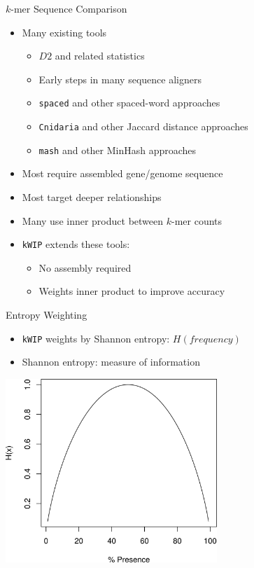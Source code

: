 \documentclass[t]{beamer}
\begin{document}
\begin{frame}{$k$-mer Sequence Comparison}
  \begin{itemize}
    \item Many existing tools
    \begin{itemize}
      \item $D2$ and related statistics
      \item Early steps in many sequence aligners
      \item \texttt{spaced} and other spaced-word approaches
        \autocite{morgenstern_estimating_2015,leimeister_fast_2014}
      \item \texttt{Cnidaria} and other Jaccard distance approaches
        \autocite{aflitos_cnidaria:_2015}
      \item \texttt{mash} and other MinHash approaches
        \autocite{ondov_fast_2015}
    \end{itemize}
    \item Most require assembled gene/genome sequence
    \item Most target deeper relationships
    \item Many use inner product between $k$-mer counts
    \item \texttt{kWIP} extends these tools:
      \begin{itemize}
        \item No assembly required
        \item Weights inner product to improve accuracy
      \end{itemize}
  \end{itemize}
\end{frame}


\begin{frame}{Entropy Weighting}
  \begin{itemize}
    \item \texttt{kWIP} weights by Shannon entropy: $H(frequency)$
    \item Shannon entropy: measure of information
  \end{itemize}
  \begin{center}
    \includegraphics[width=0.6\textwidth]{img/shanent.png}
  \end{center}
\end{frame}
\end{document}
